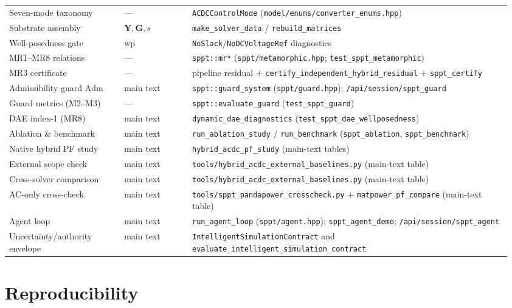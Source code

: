 \documentclass[preprint,12pt,a4paper]{elsarticle}
\newcommand{\Ybus}{\mathbf{Y}}
\newcommand{\Gdc}{\mathbf{G}}
\newcommand{\Adm}{\mathrm{Adm}}
\renewcommand{\wp}{\mathrm{wp}}
\newcommand{\code}[1]{\texttt{#1}}
\begin{document}
\begin{longtable}{@{}>{\raggedright\arraybackslash}p{0.22\linewidth}
  >{\raggedright\arraybackslash}p{0.13\linewidth}
  >{\raggedright\arraybackslash}p{0.61\linewidth}@{}}
Seven-mode taxonomy & --- & \code{ACDCControlMode} (\code{model/enums/converter\_enums.hpp}) \\
Substrate assembly & $\Ybus,\Gdc,s$ & \code{make\_solver\_data} / \code{rebuild\_matrices} \\
Well-posedness gate & $\wp$ & \code{NoSlack}/\code{NoDCVoltageRef} diagnostics \\
\midrule
MR1--MR8 relations & --- & \code{sppt::mr*} (\code{sppt/metamorphic.hpp}; \code{test\_sppt\_metamorphic}) \\
MR3 certificate & --- & pipeline residual $+$ \code{certify\_independent\_hybrid\_residual} $+$ \code{sppt\_certify} \\
Admissibility guard $\Adm$ & main text & \code{sppt::guard\_system} (\code{sppt/guard.hpp}); \code{/api/session/sppt\_guard} \\
Guard metrics (M2--M3) & --- & \code{sppt::evaluate\_guard} (\code{test\_sppt\_guard}) \\
DAE index-1 (MR8) & main text & \code{dynamic\_dae\_diagnostics} (\code{test\_sppt\_dae\_wellposedness}) \\
Ablation \& benchmark & main text & \code{run\_ablation\_study} / \code{run\_benchmark} (\code{sppt\_ablation}, \code{sppt\_benchmark}) \\
Native hybrid PF study & main text & \code{hybrid\_acdc\_pf\_study} (main-text tables) \\
External scope check & main text & \code{tools/hybrid\_acdc\_external\_baselines.py} (main-text table) \\
Cross-solver comparison & main text & \code{tools/hybrid\_acdc\_external\_baselines.py} (main-text table) \\
AC-only cross-check & main text & \code{tools/sppt\_pandapower\_crosscheck.py} $+$ \code{matpower\_pf\_compare} (main-text table) \\
Agent loop & main text & \code{run\_agent\_loop} (\code{sppt/agent.hpp}); \code{sppt\_agent\_demo}; \code{/api/session/sppt\_agent} \\
Uncertainty/authority envelope & main text & \code{IntelligentSimulationContract} and \code{evaluate\_intelligent\_simulation\_contract} \\
\end{longtable}
\endgroup

\section{Reproducibility}\label{sup:repro}
\end{document}
